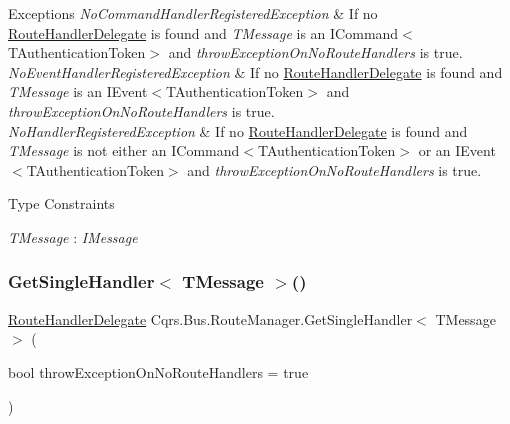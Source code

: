 \begin{DoxyExceptions}{Exceptions}
{\em No\+Command\+Handler\+Registered\+Exception} & If no \hyperlink{classCqrs_1_1Bus_1_1RouteHandlerDelegate}{Route\+Handler\+Delegate} is found and {\itshape T\+Message}  is an I\+Command$<$\+T\+Authentication\+Token$>$ and {\itshape throw\+Exception\+On\+No\+Route\+Handlers}  is true.\\
\hline
{\em No\+Event\+Handler\+Registered\+Exception} & If no \hyperlink{classCqrs_1_1Bus_1_1RouteHandlerDelegate}{Route\+Handler\+Delegate} is found and {\itshape T\+Message}  is an I\+Event$<$\+T\+Authentication\+Token$>$ and {\itshape throw\+Exception\+On\+No\+Route\+Handlers}  is true.\\
\hline
{\em No\+Handler\+Registered\+Exception} & If no \hyperlink{classCqrs_1_1Bus_1_1RouteHandlerDelegate}{Route\+Handler\+Delegate} is found and {\itshape T\+Message}  is not either an I\+Command$<$\+T\+Authentication\+Token$>$ or an I\+Event$<$\+T\+Authentication\+Token$>$ and {\itshape throw\+Exception\+On\+No\+Route\+Handlers}  is true.\\
\hline
\end{DoxyExceptions}
\begin{Desc}
\item[Type Constraints]\begin{description}
\item[{\em T\+Message} : {\em I\+Message}]\end{description}
\end{Desc}
\mbox{\label{classCqrs_1_1Bus_1_1RouteManager_a1fafb5abc81384949c51b1d8887a7921_a1fafb5abc81384949c51b1d8887a7921}} 
\subsubsection{\texorpdfstring{Get\+Single\+Handler$<$ T\+Message $>$()}{GetSingleHandler< TMessage >()}\hspace{0.1cm}{\footnotesize\ttfamily [1/2]}}
{\footnotesize\ttfamily \hyperlink{classCqrs_1_1Bus_1_1RouteHandlerDelegate}{Route\+Handler\+Delegate} Cqrs.\+Bus.\+Route\+Manager.\+Get\+Single\+Handler$<$ T\+Message $>$ (\begin{DoxyParamCaption}\item[{bool}]{throw\+Exception\+On\+No\+Route\+Handlers = {\ttfamily true} }\end{DoxyParamCaption})}



